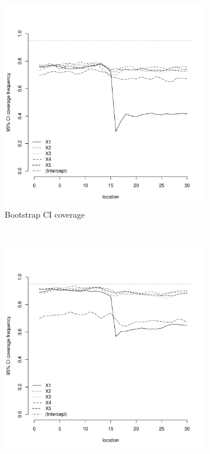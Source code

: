 \documentclass[authoryear, review, 11pt]{elsarticle}
\begin{document}
\begin{figure}
	\vspace{-30mm}
	\centering
	\begin{subfigure}[b]{0.45\textwidth}
	\centering
		\includegraphics[width=\textwidth]{../../figures/simulation/15.33.profile_bootstrap_coverage.pdf}
		\caption{Bootstrap CI coverage}
	\end{subfigure}%
	~ %
	\begin{subfigure}[b]{0.45\textwidth}
	\centering
		\includegraphics[width=\textwidth]{../../figures/simulation/15.33.profile_se_coverage.pdf}

\end{subfigure}
\end{figure}
\end{document}
